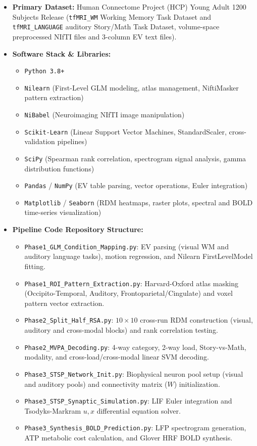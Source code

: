 \documentclass[11pt,a4paper]{article}
\begin{document}
\begin{itemize}
    \item \textbf{Primary Dataset:} Human Connectome Project (HCP) Young Adult 1200 Subjects Release (\texttt{tfMRI\_WM} Working Memory Task Dataset and \texttt{tfMRI\_LANGUAGE} auditory Story/Math Task Dataset, volume-space preprocessed NIfTI files and 3-column EV text files).
    \item \textbf{Software Stack \& Libraries:}
    \begin{itemize}
        \item \texttt{Python 3.8+}
        \item \texttt{Nilearn} (First-Level GLM modeling, atlas management, NiftiMasker pattern extraction)
        \item \texttt{NiBabel} (Neuroimaging NIfTI image manipulation)
        \item \texttt{Scikit-Learn} (Linear Support Vector Machines, StandardScaler, cross-validation pipelines)
        \item \texttt{SciPy} (Spearman rank correlation, spectrogram signal analysis, gamma distribution functions)
        \item \texttt{Pandas} / \texttt{NumPy} (EV table parsing, vector operations, Euler integration)
        \item \texttt{Matplotlib} / \texttt{Seaborn} (RDM heatmaps, raster plots, spectral and BOLD time-series visualization)
    \end{itemize}
    \item \textbf{Pipeline Code Repository Structure:}
    \begin{itemize}
        \item \texttt{Phase1\_GLM\_Condition\_Mapping.py}: EV parsing (visual WM and auditory language tasks), motion regression, and Nilearn FirstLevelModel fitting.
        \item \texttt{Phase1\_ROI\_Pattern\_Extraction.py}: Harvard-Oxford atlas masking (Occipito-Temporal, Auditory, Frontoparietal/Cingulate) and voxel pattern vector extraction.
        \item \texttt{Phase2\_Split\_Half\_RSA.py}: $10 \times 10$ cross-run RDM construction (visual, auditory and cross-modal blocks) and rank correlation testing.
        \item \texttt{Phase2\_MVPA\_Decoding.py}: 4-way category, 2-way load, Story-vs-Math, modality, and cross-load/cross-modal linear SVM decoding.
        \item \texttt{Phase3\_STSP\_Network\_Init.py}: Biophysical neuron pool setup (visual and auditory pools) and connectivity matrix ($W$) initialization.
        \item \texttt{Phase3\_STSP\_Synaptic\_Simulation.py}: LIF Euler integration and Tsodyks-Markram $u, x$ differential equation solver.
        \item \texttt{Phase3\_Synthesis\_BOLD\_Prediction.py}: LFP spectrogram generation, ATP metabolic cost calculation, and Glover HRF BOLD synthesis.
    \end{itemize}
\end{itemize}
\end{document}
